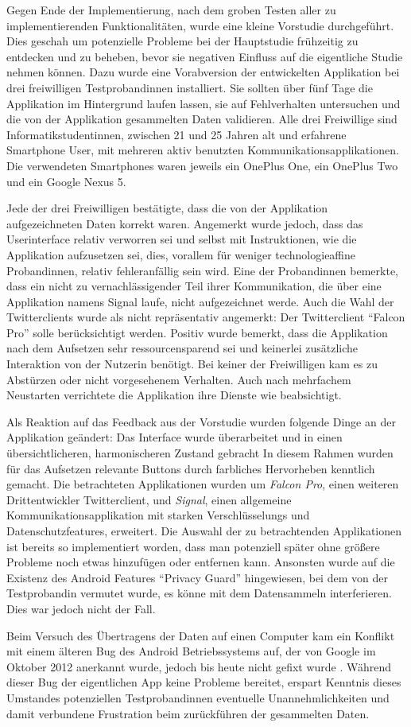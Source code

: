 Gegen Ende der Implementierung, nach dem groben Testen aller zu implementierenden Funktionalitäten, wurde eine kleine Vorstudie durchgeführt.
Dies geschah um potenzielle Probleme bei der Hauptstudie frühzeitig zu entdecken und zu beheben, bevor sie negativen Einfluss auf die eigentliche Studie nehmen können.
Dazu wurde eine Vorabversion der entwickelten Applikation bei drei freiwilligen Testprobandinnen installiert.
Sie sollten über fünf Tage die Applikation im Hintergrund laufen lassen, sie auf Fehlverhalten untersuchen und die von der Applikation gesammelten Daten validieren.
Alle drei Freiwillige sind Informatikstudentinnen, zwischen 21 und 25 Jahren alt und erfahrene Smartphone User, mit mehreren aktiv benutzten Kommunikationsapplikationen.
Die verwendeten Smartphones waren jeweils ein OnePlus One, ein OnePlus Two und ein Google Nexus 5.
\par
Jede der drei Freiwilligen bestätigte, dass die von der Applikation aufgezeichneten Daten korrekt waren.
Angemerkt wurde jedoch, dass das Userinterface relativ verworren sei und selbst mit Instruktionen, wie die Applikation aufzusetzen sei, dies, vorallem für weniger technologieaffine Probandinnen, relativ fehleranfällig sein wird.
Eine der Probandinnen bemerkte, dass ein nicht zu vernachlässigender Teil ihrer Kommunikation, die über eine Applikation namens Signal laufe, nicht aufgezeichnet werde.
Auch die Wahl der Twitterclients wurde als nicht repräsentativ angemerkt:
Der Twitterclient "`Falcon Pro"' solle berücksichtigt werden.
Positiv wurde bemerkt, dass die Applikation nach dem Aufsetzen sehr ressourcensparend sei und keinerlei zusätzliche Interaktion von der Nutzerin benötigt.
Bei keiner der Freiwilligen kam es zu Abstürzen oder nicht vorgesehenem Verhalten. Auch nach mehrfachem Neustarten verrichtete die Applikation ihre Dienste wie beabsichtigt.
\par
Als Reaktion auf das Feedback aus der Vorstudie wurden folgende Dinge an der Applikation geändert:
Das Interface wurde überarbeitet und in einen übersichtlicheren, harmonischeren Zustand gebracht
In diesem Rahmen wurden für das Aufsetzen relevante Buttons durch farbliches Hervorheben kenntlich gemacht.
Die betrachteten Applikationen wurden um \emph{Falcon Pro}, einen weiteren Drittentwickler Twitterclient, und \emph{Signal}, einen allgemeine Kommunikationsapplikation mit starken Verschlüsselungs und Datenschutzfeatures, erweitert.
Die Auswahl der zu betrachtenden Applikationen ist bereits so implementiert worden, dass man potenziell später ohne größere Probleme noch etwas hinzufügen oder entfernen kann.
Ansonsten wurde auf die Existenz des Android Features "`Privacy Guard"' hingewiesen, bei dem von der Testprobandin vermutet wurde, es könne mit dem Datensammeln interferieren.
Dies war jedoch nicht der Fall.
\par
Beim Versuch des Übertragens der Daten auf einen Computer kam ein Konflikt mit einem älteren Bug des Android Betriebssystems auf, der von Google im Oktober 2012 anerkannt wurde, jedoch bis heute nicht gefixt wurde
\cite{androidbug}.
Während dieser Bug der eigentlichen App keine Probleme bereitet, erspart Kenntnis dieses Umstandes potenziellen Testprobandinnen eventuelle Unannehmlichkeiten und damit verbundene Frustration beim zurückführen der gesammelten Daten.


